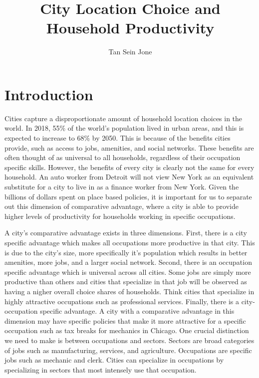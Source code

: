 \documentclass[10pt]{article}
\title{City Location Choice and Household Productivity}
\author{Tan Sein Jone}
\date{}
\begin{document}
\doublespacing
\maketitle

\section{Introduction}

Cities capture a disproportionate amount of household location choices in the world. In 2018, 55\% of the world's population lived in urban areas, and this is expected to increase to 68\% by 2050. This is because of the benefits cities provide, such as access to jobs, amenities, and social networks. These benefits are often thought of as universal to all households, regardless of their occupation specific skills. However, the benefits of every city is clearly not the same for every household. An auto worker from Detroit will not view New York as an equivalent substitute for a city to live in as a finance worker from New York. Given the billions of dollars spent on place based policies, it is important for us to separate out this dimension of comparative advantage, where a city is able to provide higher levels of productivity for households working in specific occupations.

A city's comparative advantage exists in three dimensions. First, there is a city specific advantage which makes all occupations more productive in that city. This is due to the city's size, more specifically it's population which results in better amenities, more jobs, and a larger social network. Second, there is an occupation specific advantage which is universal across all cities. Some jobs are simply more productive than others and cities that specialize in that job will be observed as having a nigher overall choice shares of households. Think cities that specialize in highly attractive occupations such as professional services. Finally, there is a city-occupation specific advantage. A city with a comparative advantage in this dimension may have specific policies that make it more attractive for a specific occupation such as tax breaks for mechanics in Chicago. One crucial distinction we need to make is between occupations and sectors. Sectors are broad categories of jobs such as manufacturing, services, and agriculture. Occupations are specific jobs such as mechanic and clerk. Cities can specialize in occupations by specializing in sectors that most intensely use that occupation.
\end{document}

